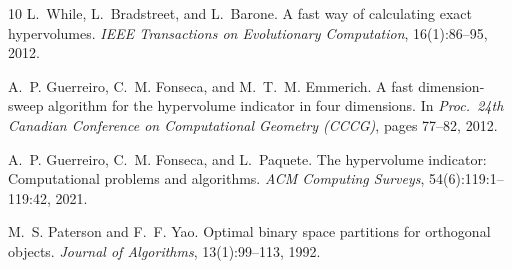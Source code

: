 \documentclass[11pt,a4paper]{article}
\theoremstyle{remark}
\begin{document}
\begin{thebibliography}{10}
L.~While, L.~Bradstreet, and L.~Barone.
\newblock A fast way of calculating exact hypervolumes.
\newblock \emph{IEEE Transactions on Evolutionary Computation},
  16(1):86--95, 2012.

A.~P. Guerreiro, C.~M. Fonseca, and M.~T.~M. Emmerich.
\newblock A fast dimension-sweep algorithm for the hypervolume indicator in
  four dimensions.
\newblock In \emph{Proc.\ 24th Canadian Conference on Computational Geometry
  (CCCG)}, pages 77--82, 2012.

A.~P. Guerreiro, C.~M. Fonseca, and L.~Paquete.
\newblock The hypervolume indicator: Computational problems and algorithms.
\newblock \emph{ACM Computing Surveys}, 54(6):119:1--119:42, 2021.

M.~S. Paterson and F.~F. Yao.
\newblock Optimal binary space partitions for orthogonal objects.
\newblock \emph{Journal of Algorithms}, 13(1):99--113, 1992.

\end{thebibliography}
\end{document}
